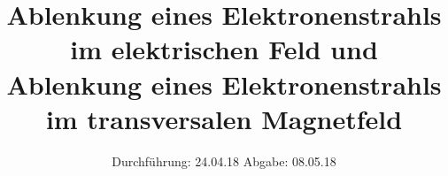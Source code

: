 

\subject{V501 und V502}
\title{Ablenkung eines Elektronenstrahls im elektrischen Feld und Ablenkung eines Elektronenstrahls im transversalen Magnetfeld}
\date{
  Durchführung: 24.04.18
  \hspace{3em}
  Abgabe: 08.05.18
}



\maketitle
\thispagestyle{empty}
\tableofcontents
\newpage








\newpage
\printbibliography


